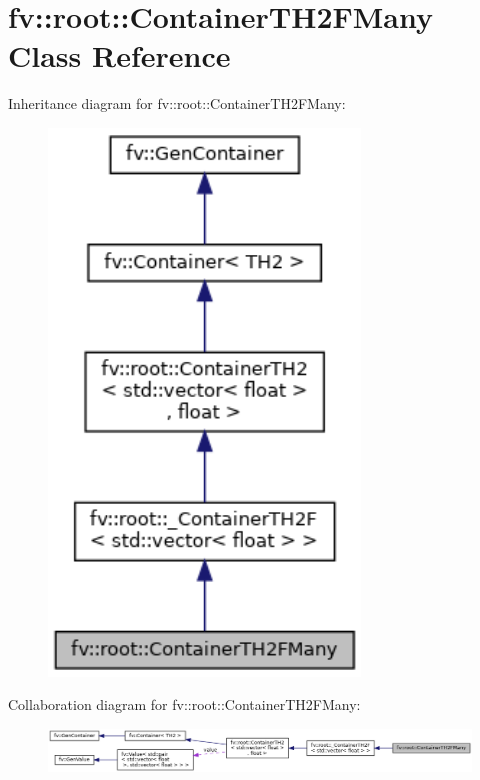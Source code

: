 \hypertarget{classfv_1_1root_1_1ContainerTH2FMany}{}\section{fv\+:\+:root\+:\+:Container\+T\+H2\+F\+Many Class Reference}
\label{classfv_1_1root_1_1ContainerTH2FMany}


Inheritance diagram for fv\+:\+:root\+:\+:Container\+T\+H2\+F\+Many\+:
\nopagebreak
\begin{figure}[H]
\begin{center}
\leavevmode
\includegraphics[width=235pt]{classfv_1_1root_1_1ContainerTH2FMany__inherit__graph}
\end{center}
\end{figure}


Collaboration diagram for fv\+:\+:root\+:\+:Container\+T\+H2\+F\+Many\+:
\nopagebreak
\begin{figure}[H]
\begin{center}
\leavevmode
\includegraphics[width=350pt]{classfv_1_1root_1_1ContainerTH2FMany__coll__graph}
\end{center}
\end{figure}
